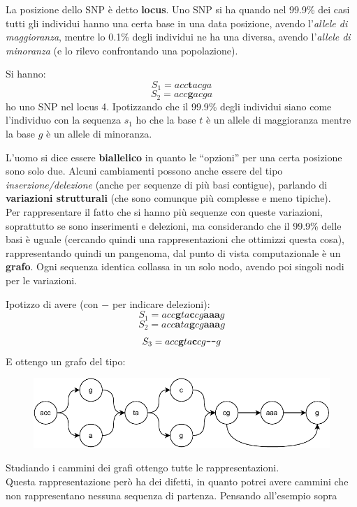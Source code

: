 \documentclass[a4paper,12pt, oneside]{book}
\begin{document}
La posizione dello SNP è detto \textbf{locus}. Uno SNP si ha quando nel 99.9\%
dei casi tutti gli individui hanno una certa base in una data posizione, avendo
l'\textit{allele di maggioranza}, mentre lo 0.1\% degli individui ne ha una
diversa, avendo l'\textit{allele di minoranza} (e lo rilevo confrontando una
popolazione). 
\begin{esempio}
  Si hanno:
  \[S_1=acc\mathbf{t}acga\]
  \[S_2=acc\mathbf{g}acga\]
  ho uno SNP nel locus 4.
  Ipotizzando che il 99.9\% degli individui siano come l'individuo con la
  sequenza $s_1$ ho che la base $t$ è un allele di maggioranza mentre la base
  $g$ è un allele di minoranza.
\end{esempio}
L'uomo si dice essere \textbf{biallelico} in quanto le ``opzioni'' per una certa
posizione sono solo due. Alcuni cambiamenti possono anche essere del tipo
\textit{inserzione/delezione} (anche per sequenze di più basi contigue),
parlando di \textbf{variazioni strutturali} (che sono comunque più complesse e
meno tipiche).\\
Per rappresentare il fatto che si hanno più sequenze con queste variazioni,
soprattutto se sono inserimenti e delezioni, ma considerando che il 99.9\% delle
basi è uguale (cercando quindi una rappresentazioni che ottimizzi questa cosa),
rappresentando quindi un pangenoma, dal punto di vista computazionale è un
\textbf{grafo}. Ogni sequenza identica collassa in un solo nodo, avendo poi
singoli nodi per le variazioni.
\begin{esempio}
  Ipotizzo di avere (con $-$ per indicare delezioni):
  \[S_1=acc\mathbf{g}ta\mathbf{c}cg\mathbf{aaa}g\]
  \[S_2=acc\mathbf{a}ta\mathbf{g}cg\mathbf{aaa}g\]
  \[S_3=acc\mathbf{g}ta\mathbf{c}cg\mbox{\textbf{\texttt{---}}}g\]
  E ottengo un grafo del tipo:
  \begin{figure}[H]
    \centering
    \includegraphics[width=\textwidth]{img/gra.pdf}
  \end{figure}
\end{esempio}
Studiando i cammini dei grafi ottengo tutte le rappresentazioni.\\
Questa rappresentazione però ha dei difetti, in quanto potrei avere cammini che
non rappresentano nessuna sequenza di partenza. Pensando all'esempio sopra
\end{document}
